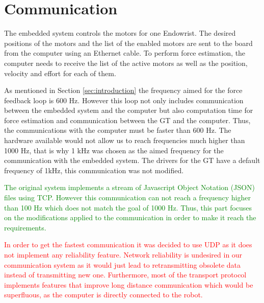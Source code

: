 \section{Communication}
The embedded system controls the motors for one Endowrist. The desired positions of the motors and the list of the enabled motors are sent to the board from the computer using an Ethernet cable. To perform force estimation, the computer needs to receive the list of the active motors as well as the position, velocity and effort for each of them.

As mentioned in Section \ref{sec:introduction} the frequency aimed for the force feedback loop is 600 Hz. However this loop not only includes communication between the embedded system and the computer but also computation time for force estimation and communication between the GT and the computer. Thus, the communications with the computer must be faster than 600 Hz. The hardware available would not allow us to reach frequencies much higher than 1000 Hz, that is why 1 kHz was chosen as the aimed frequency for the communication with the embedded system. The drivers for the GT have a default frequency of 1kHz, this communication was not modified.


\textcolor{green}{The original system implements a stream of Javascript Object Notation (JSON)\cite{JSON_IETF} files using TCP. However this communication can not reach a frequency higher than 100 Hz which does not match the goal of 1000 Hz. Thus, this part focuses on the modifications applied to the communication in order to make it reach the requirements.}

\textcolor{red}{In order to get the fastest communication it was decided to use UDP as it does not implement any reliability feature. Network reliability is undesired in our communication system as it would just lead to retransmitting obsolete data instead of transmitting new one. Furthermore, most of the transport protocol implements features that improve long distance communication which would be superfluous, as the computer is directly connected to the robot.}
 
